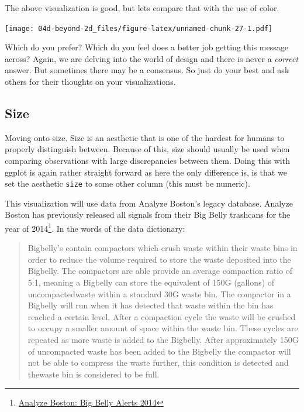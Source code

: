 \documentclass[
]{book}
\begin{document}
The above visualization is good, but lets compare that with the use of color.

\texttt{[image: 04d-beyond-2d\_files/figure-latex/unnamed-chunk-27-1.pdf]}

Which do you prefer? Which do you feel does a better job getting this message across? Again, we are delving into the world of design and there is never a \emph{correct} answer. But sometimes there may be a consensus. So just do your best and ask others for their thoughts on your visualizations.

\hypertarget{size}{%
\subsection{Size}\label{size}}

Moving onto size. Size is an aesthetic that is one of the hardest for humans to properly distinguish between. Because of this, size should usually be used when comparing observations with large discrepancies between them. Doing this with ggplot is again rather straight forward as here the only difference is, is that we set the aesthetic \texttt{size} to some other column (this must be numeric).

This visualization will use data from Analyze Boston's legacy database. Analyze Boston has previously released all signals from their Big Belly trashcans for the year of 2014\footnote{\href{https://data.boston.gov/dataset/big-belly-alerts-2014/resource/8fb74119-97b9-4114-b773-ea0a82142d3b}{Analyze Boston: Big Belly Alerts 2014}}. In the words of the data dictionary:

\begin{quote}
Bigbelly's contain compactors which crush waste within their waste bins in order to reduce the volume required to store the waste deposited into the Bigbelly. The compactors are able provide an average compaction ratio of 5:1, meaning a Bigbelly can store the equivalent of 150G (gallons) of uncompactedwaste within a standard 30G waste bin. The compactor in a Bigbelly will run when it has detected that waste within the bin has reached a certain level. After a compaction cycle the waste will be crushed to occupy a smaller amount of space within the waste bin. These cycles are repeated as more waste is added to the Bigbelly. After approximately 150G of uncompacted waste has been added to the Bigbelly the compactor will not be able to compress the waste further, this condition is detected and thewaste bin is considered to be full.
\end{quote}
\end{document}
